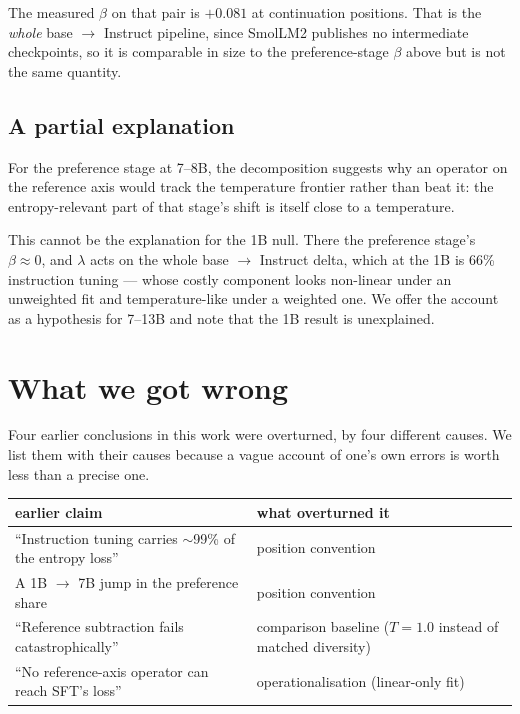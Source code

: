 \documentclass[11pt]{article}
\begin{document}
The measured $\beta$ on that pair is $+0.081$ at continuation positions. That is the
\emph{whole} base $\to$ Instruct pipeline, since SmolLM2 publishes no intermediate
checkpoints, so it is comparable in size to the preference-stage $\beta$ above but
is not the same quantity.

\subsection{A partial explanation}

For the preference stage at 7--8B, the decomposition suggests why an operator on the
reference axis would track the temperature frontier rather than beat it: the
entropy-relevant part of that stage's shift is itself close to a temperature.

This cannot be the explanation for the 1B null. There the preference stage's
$\beta \approx 0$, and $\lambda$ acts on the whole base $\to$ Instruct delta, which
at the 1B is 66\% instruction tuning --- whose costly component looks non-linear
under an unweighted fit and temperature-like under a weighted one. We offer the
account as a hypothesis for 7--13B and note that the 1B result is unexplained.

\section{What we got wrong}
\label{sec:failures}

Four earlier conclusions in this work were overturned, by four different causes. We
list them with their causes because a vague account of one's own errors is worth
less than a precise one.

\begin{center}
\begin{tabular}{l p{}}
\toprule
earlier claim & what overturned it \\
\midrule
``Instruction tuning carries $\sim$99\% of the entropy loss'' & position convention \\
A 1B $\to$ 7B jump in the preference share & position convention \\
``Reference subtraction fails catastrophically'' & comparison baseline ($T = 1.0$ instead of matched diversity) \\
``No reference-axis operator can reach SFT's loss'' & operationalisation (linear-only fit) \\
\bottomrule
\end{tabular}
\end{center}
\end{document}
